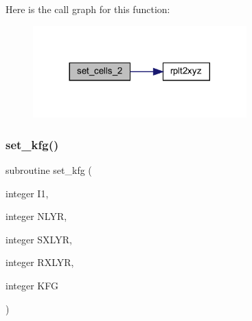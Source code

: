 Here is the call graph for this function\+:\nopagebreak
\begin{figure}[H]
\begin{center}
\leavevmode
\includegraphics[width=233pt]{Leroi__c_8f90_a14cc0157cbf2d5d8c0af6167028061cf_cgraph}
\end{center}
\end{figure}
\mbox{\label{Leroi__c_8f90_a8e7ce2c7dc3e5ee45a8adefc6e6bba97}} 
\subsubsection{\texorpdfstring{set\+\_\+kfg()}{set\_kfg()}}
{\footnotesize\ttfamily subroutine set\+\_\+kfg (\begin{DoxyParamCaption}\item[{integer}]{I1,  }\item[{integer}]{N\+L\+YR,  }\item[{integer}]{S\+X\+L\+YR,  }\item[{integer}]{R\+X\+L\+YR,  }\item[{integer}]{K\+FG }\end{DoxyParamCaption})}

\mbox{\label{Leroi__c_8f90_a27d896475f3529fb2188ec4474b27717}} 
